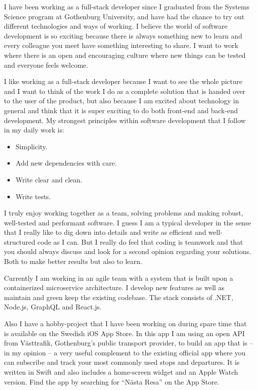 

I have been working as a full-stack developer since I graduated from the Systems Science program at
Gothenburg University, and have had the chance to try out different technologies and ways
of working. I believe the world of software development is so exciting because there is always something new
to learn and every colleague you meet have something interesting to share. I want to work where there is an
open and encouraging culture where new things can be tested and everyone feels welcome.

I like working as a full-stack developer because I want to see the whole picture and I want to think of the work
I do as a complete solution that is handed over to the user of the product, but also because I am
excited about technology in general and think that it is super exciting to do both front-end and
back-end development. My strongest principles within software development that I follow in my daily work is:

\begin{itemize}
  \item Simplicity.
  \item Add new dependencies with care.
  \item Write clear and clean.
  \item Write tests.
\end{itemize}

I truly enjoy working together as a team, solving problems and making robust, well-tested and
performant software. I guess I am a typical developer in the sense that I really like
to dig down into details and write as efficient and well-structured code as I can. But I really do feel that coding
is teamwork and that you should always discuss and look for a second opinion regarding your solutions.
Both to make better results but also to learn.

Currently I am working in an agile team with a system that is built upon a containerized microservice architecture.
I develop new features as well as maintain and green keep the existing codebase.
The stack consists of .NET, Node.js, GraphQL and React.js.

Also I have a hobby-project that I have been working on during spare time that is available
on the Swedish iOS App Store. In this app I am using an open API from Västtrafik, Gothenburg’s public
transport provider, to build an app that is – in my opinion – a very useful complement to the
existing official app where you can subscribe and track your most commonly used stops and departures.
It is written in Swift and also includes a home-screen widget and an Apple Watch version. Find
the app by searching for “Nästa Resa” on the App Store.

